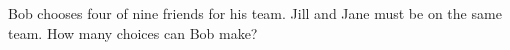 Bob chooses four of nine friends for his team. Jill and Jane must be on the same team. How many choices can Bob make?
